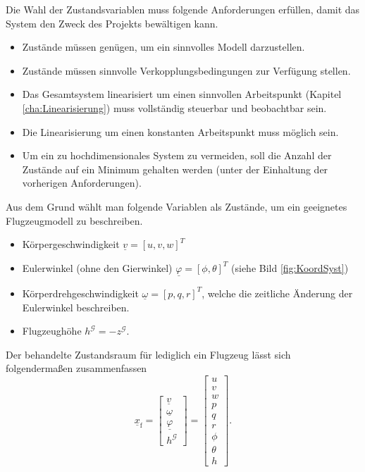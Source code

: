 Die Wahl der Zustandsvariablen muss folgende Anforderungen erfüllen, damit das System den Zweck des Projekts bewältigen kann.
\begin{itemize}
\item Zustände müssen genügen, um ein sinnvolles Modell darzustellen. 
\item Zustände müssen sinnvolle Verkopplungsbedingungen zur Verfügung stellen.
\item Das Gesamtsystem linearisiert um einen sinnvollen Arbeitspunkt (Kapitel \ref{cha:Linearisierung}) muss vollständig steuerbar und beobachtbar sein.
\item Die Linearisierung um einen konstanten Arbeitspunkt muss möglich sein.
\item Um ein zu hochdimensionales System zu vermeiden, soll die Anzahl der Zustände auf ein Minimum gehalten werden (unter der Einhaltung der vorherigen Anforderungen). 
\end{itemize}
Aus dem Grund wählt man folgende Variablen als Zustände, um ein geeignetes Flugzeugmodell zu beschreiben.
\begin{itemize}
\item Körpergeschwindigkeit $\underline{v} = [u, v, w]^T$
\item Eulerwinkel (ohne den Gierwinkel) $\underline{\varphi} = [\phi, \theta]^T$ (siehe Bild \ref{fig:KoordSyst})
\item Körperdrehgeschwindigkeit $\underline{\omega} = [p, q, r]^T$, welche die zeitliche Änderung der Eulerwinkel beschreiben.
\item Flugzeughöhe $h^\mathcal{G} = -z^\mathcal{G}$.
\end{itemize}
Der behandelte Zustandsraum für lediglich ein Flugzeug lässt sich folgendermaßen zusammenfassen\\
\begin{equation}
\underline{x}_\mathrm{f} = \begin{bmatrix} 
\underline{v} \\
\underline{\omega} \\
\underline{\varphi}\\
h^\mathcal{G}
\end{bmatrix} = \begin{bmatrix} 
u\\v\\w\\p\\q\\r\\ \phi\\ \theta\\ h
\end{bmatrix}.
\end{equation}
